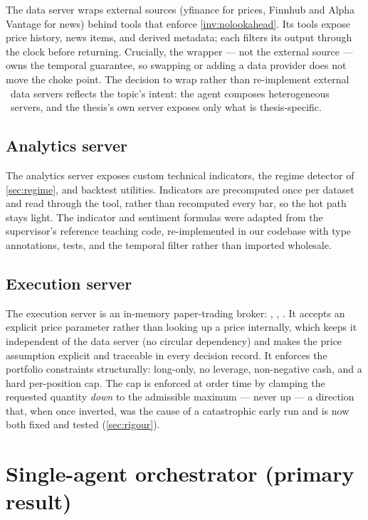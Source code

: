 The data server wraps external sources (yfinance for prices, Finnhub and Alpha Vantage for
news) behind tools that enforce \cref{inv:nolookahead}. Its tools expose price history,
news items, and derived metadata; each filters its output through the clock before
returning. Crucially, the wrapper --- not the external source --- owns the temporal
guarantee, so swapping or adding a data provider does not move the choke point. The decision
to wrap rather than re-implement external \mcp\ data servers reflects the topic's intent:
the agent composes heterogeneous \mcp\ servers, and the thesis's own server exposes only
what is thesis-specific.

\subsection{Analytics server}

The analytics server exposes custom technical indicators, the regime detector of
\cref{sec:regime}, and backtest utilities. Indicators are precomputed once per dataset and
read through the tool, rather than recomputed every bar, so the hot path stays light. The
indicator and sentiment formulas were adapted from the supervisor's reference teaching
code, re-implemented in our codebase with type annotations, tests, and the temporal filter
rather than imported wholesale.

\subsection{Execution server}

The execution server is an in-memory paper-trading broker: ,
, . It accepts an explicit price parameter rather than
looking up a price internally, which keeps it independent of the data server (no circular
dependency) and makes the price assumption explicit and traceable in every decision record.
It enforces the portfolio constraints structurally: long-only, no leverage, non-negative
cash, and a hard per-position cap. The cap is enforced at order time by clamping the
requested quantity \emph{down} to the admissible maximum --- never up --- a direction that,
when once inverted, was the cause of a catastrophic early run and is now both fixed and
tested (\cref{sec:rigour}).

\section{Single-agent orchestrator (primary result)}
\label{sec:single}

